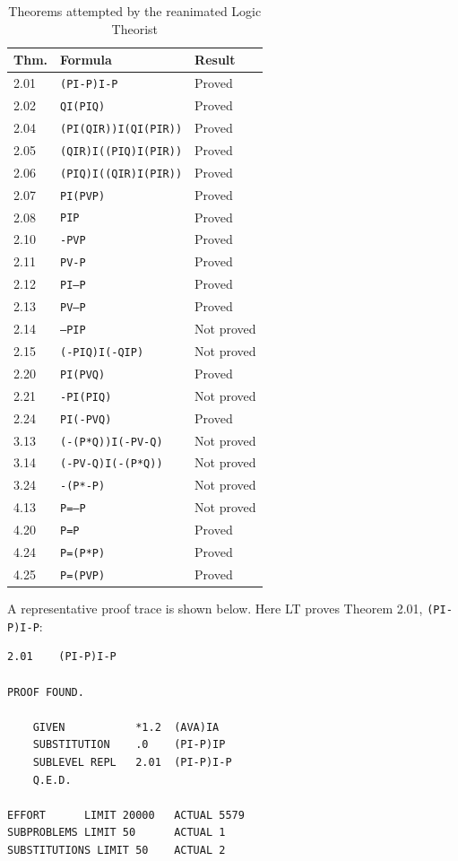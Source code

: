\documentclass[journal]{IEEEtran}
\begin{document}
\begin{table}[h]
\centering
\caption{Theorems attempted by the reanimated Logic Theorist}
\label{tab:results}
\begin{tabular}{lll}
\toprule
\textbf{Thm.} & \textbf{Formula} & \textbf{Result} \\
\midrule
2.01 & \texttt{(PI-P)I-P} & Proved \\
2.02 & \texttt{QI(PIQ)} & Proved \\
2.04 & \texttt{(PI(QIR))I(QI(PIR))} & Proved \\
2.05 & \texttt{(QIR)I((PIQ)I(PIR))} & Proved \\
2.06 & \texttt{(PIQ)I((QIR)I(PIR))} & Proved \\
2.07 & \texttt{PI(PVP)} & Proved \\
2.08 & \texttt{PIP} & Proved \\
2.10 & \texttt{-PVP} & Proved \\
2.11 & \texttt{PV-P} & Proved \\
2.12 & \texttt{PI--P} & Proved \\
2.13 & \texttt{PV---P} & Proved \\
2.14 & \texttt{--PIP} & Not proved \\
2.15 & \texttt{(-PIQ)I(-QIP)} & Not proved \\
2.20 & \texttt{PI(PVQ)} & Proved \\
2.21 & \texttt{-PI(PIQ)} & Not proved \\
2.24 & \texttt{PI(-PVQ)} & Proved \\
3.13 & \texttt{(-(P*Q))I(-PV-Q)} & Not proved \\
3.14 & \texttt{(-PV-Q)I(-(P*Q))} & Not proved \\
3.24 & \texttt{-(P*-P)} & Not proved \\
4.13 & \texttt{P=--P} & Not proved \\
4.20 & \texttt{P=P} & Proved \\
4.24 & \texttt{P=(P*P)} & Proved \\
4.25 & \texttt{P=(PVP)} & Proved \\
\bottomrule
\end{tabular}
\end{table}

A representative proof trace is shown below. Here LT proves Theorem
2.01, \texttt{(PI-P)I-P}:

\begin{lstlisting}
2.01    (PI-P)I-P

PROOF FOUND.

    GIVEN           *1.2  (AVA)IA
    SUBSTITUTION    .0    (PI-P)IP
    SUBLEVEL REPL   2.01  (PI-P)I-P
    Q.E.D.

EFFORT      LIMIT 20000   ACTUAL 5579
SUBPROBLEMS LIMIT 50      ACTUAL 1
SUBSTITUTIONS LIMIT 50    ACTUAL 2
\end{lstlisting}
\end{document}
